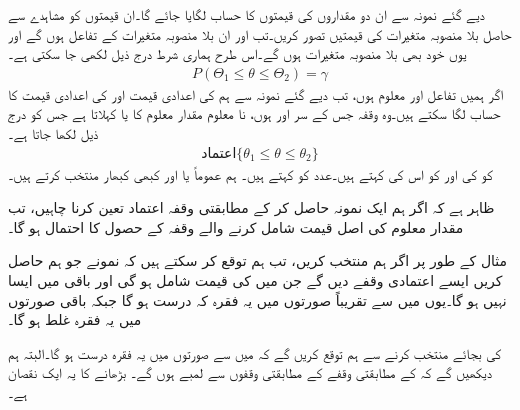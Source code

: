 دیے گئے نمونہ  سے ان دو مقداروں کی قیمتوں کا حساب لگایا جائے گا۔ان  قیمتوں کو مشاہدے سے حاصل  بلا منصوبہ متغیرات  کی قیمتیں تصور کریں۔تب  اور  ان بلا منصوبہ متغیرات کے تفاعل ہوں گے اور یوں خود بھی بلا منصوبہ متغیرات ہوں گے۔اس طرح ہماری شرط درج ذیل لکھی جا سکتی ہے۔
\begin{align*}
P(\Theta_1\le \theta \le \Theta_2)=\gamma
\end{align*}
اگر ہمیں تفاعل  اور  معلوم ہوں، تب دیے گئے نمونہ سے ہم  کی  اعدادی قیمت  اور  کی اعدادی قیمت  کا حساب لگا سکتے ہیں۔وہ وقفہ جس کے سر  اور  ہوں، نا معلوم مقدار معلوم  کا   یا  کہلاتا ہے جس کو درج ذیل لکھا جاتا ہے۔
\begin{align*}
\text{اعتماد}\{\theta_1\le \theta\le \theta_2\}
\end{align*}
 کو   کی  اور  کو اس کی   کہتے ہیں۔عدد  کو  کہتے ہیں۔ ہم عموماً  یا  اور کبھی کبھار  منتخب کرتے ہیں۔

ظاہر ہے کہ اگر ہم ایک نمونہ حاصل کر کے مطابقتی وقفہ اعتماد تعین کرنا چاہیں، تب مقدار معلوم کی اصل قیمت شامل کرنے والے وقفہ کے حصول کا احتمال  ہو گا۔

مثال کے طور پر اگر ہم  منتخب  کریں، تب ہم توقع کر سکتے ہیں کہ  نمونے جو ہم حاصل کریں ایسے اعتمادی وقفے دیں گے جن میں  کی قیمت شامل ہو گی اور باقی  میں ایسا نہیں ہو گا۔یوں  میں سے تقریباً  صورتوں میں  یہ فقرہ کہ   درست ہو گا جبکہ باقی صورتوں میں یہ فقرہ غلط ہو گا۔

 کی بجائے  منتخب کرنے سے ہم توقع کریں گے کہ  میں سے  صورتوں میں یہ فقرہ درست ہو گا۔البتہ ہم دیکھیں گے کہ  کے مطابقتی وقفے  کے مطابقتی وقفوں سے  لمبے ہوں گے۔ بڑھانے کا یہ ایک نقصان ہے۔ 

